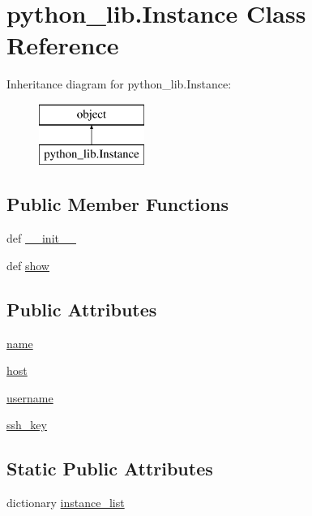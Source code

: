 \hypertarget{classpython__lib_1_1_instance}{\section{python\-\_\-lib.\-Instance Class Reference}
\label{classpython__lib_1_1_instance}
}
Inheritance diagram for python\-\_\-lib.\-Instance\-:\begin{figure}[H]
\begin{center}
\leavevmode
\includegraphics[height=2.000000cm]{classpython__lib_1_1_instance}
\end{center}
\end{figure}
\subsection*{Public Member Functions}
\begin{DoxyCompactItemize}
\item 
def \hyperlink{classpython__lib_1_1_instance_ad30bfb8274bcf446597ca8e947da6ae0}{\-\_\-\-\_\-init\-\_\-\-\_\-}
\item 
def \hyperlink{classpython__lib_1_1_instance_a48d1e6fbbceb1898fbfd74ad4374d829}{show}
\end{DoxyCompactItemize}
\subsection*{Public Attributes}
\begin{DoxyCompactItemize}
\item 
\hyperlink{classpython__lib_1_1_instance_a0fd04ce14016b7d0856233f490503ab9}{name}
\item 
\hyperlink{classpython__lib_1_1_instance_a313b98cd096f7ec75211979440ea7b12}{host}
\item 
\hyperlink{classpython__lib_1_1_instance_a425ff7c7985f4f5c0ceee7dd763db9e2}{username}
\item 
\hyperlink{classpython__lib_1_1_instance_af626e75528d2014eba57f2f158b99e93}{ssh\-\_\-key}
\end{DoxyCompactItemize}
\subsection*{Static Public Attributes}
\begin{DoxyCompactItemize}
\item 
dictionary \hyperlink{classpython__lib_1_1_instance_a27fea834047432419ffc36fea953b1bb}{instance\-\_\-list}
\end{DoxyCompactItemize}


